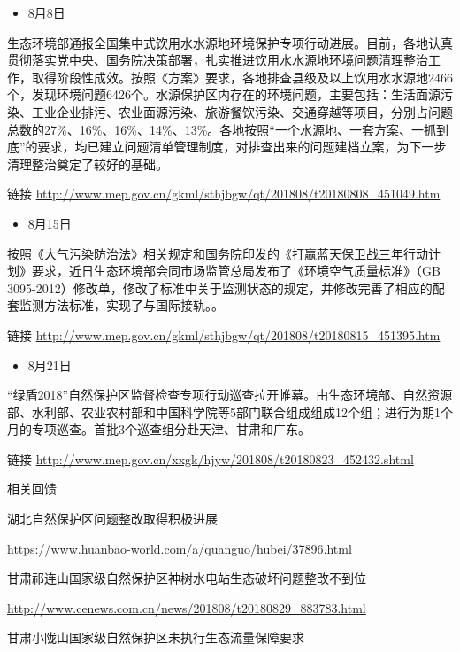 \documentclass[
]{book}
\providecommand{\tightlist}{%
  \setlength{\itemsep}{0pt}\setlength{\parskip}{0pt}}
\begin{document}
\begin{itemize}
\tightlist
\item
  8月8日
\end{itemize}

生态环境部通报全国集中式饮用水水源地环境保护专项行动进展。目前，各地认真贯彻落实党中央、国务院决策部署，扎实推进饮用水水源地环境问题清理整治工作，取得阶段性成效。按照《方案》要求，各地排查县级及以上饮用水水源地2466个，发现环境问题6426个。水源保护区内存在的环境问题，主要包括：生活面源污染、工业企业排污、农业面源污染、旅游餐饮污染、交通穿越等项目，分别占问题总数的27\%、16\%、16\%、14\%、13\%。各地按照``一个水源地、一套方案、一抓到底''的要求，均已建立问题清单管理制度，对排查出来的问题建档立案，为下一步清理整治奠定了较好的基础。

链接 \url{http://www.mep.gov.cn/gkml/sthjbgw/qt/201808/t20180808_451049.htm}

\begin{itemize}
\tightlist
\item
  8月15日
\end{itemize}

按照《大气污染防治法》相关规定和国务院印发的《打赢蓝天保卫战三年行动计划》要求，近日生态环境部会同市场监管总局发布了《环境空气质量标准》（GB 3095-2012）修改单，修改了标准中关于监测状态的规定，并修改完善了相应的配套监测方法标准，实现了与国际接轨。。

链接 \url{http://www.mep.gov.cn/gkml/sthjbgw/qt/201808/t20180815_451395.htm}

\begin{itemize}
\tightlist
\item
  8月21日
\end{itemize}

``绿盾2018''自然保护区监督检查专项行动巡查拉开帷幕。由生态环境部、自然资源部、水利部、农业农村部和中国科学院等5部门联合组成组成12个组；进行为期1个月的专项巡查。首批3个巡查组分赴天津、甘肃和广东。

链接 \url{http://www.mep.gov.cn/xxgk/hjyw/201808/t20180823_452432.shtml}

相关回馈

湖北自然保护区问题整改取得积极进展

\url{https://www.huanbao-world.com/a/quanguo/hubei/37896.html}

甘肃祁连山国家级自然保护区神树水电站生态破坏问题整改不到位

\url{http://www.cenews.com.cn/news/201808/t20180829_883783.html}

甘肃小陇山国家级自然保护区未执行生态流量保障要求
\end{document}

